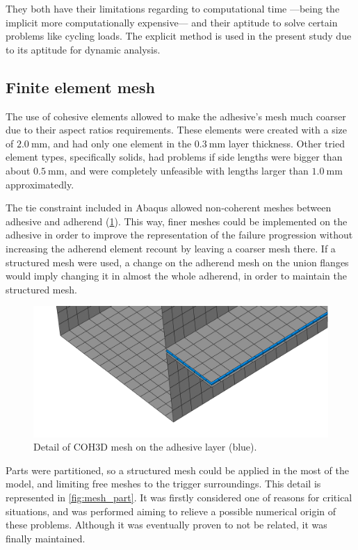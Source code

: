 \documentclass[
documentsize = a4, %
font = cmr, %
typesize = 11, %
printmode = true,
onehalfspacing = true,
language = en, %
titlepage = udciccp, %
degree = pt, %
dedication = true,
acknowledgements = true,
abstract-en = true,
abstract-es = false,
abstract-ga = false,
epigraphs = true,
toc = true,
lof = true,
lot = true,
frontmatterintoc = false,
notation = false,
minimal = false,
]{UDCthesis}
\begin{document}
They both have their limitations regarding to computational time ---being the implicit more computationally expensive--- and their aptitude to solve certain problems like cycling loads. The explicit method is used in the present study due to its aptitude for dynamic analysis.

\subsection{Finite element mesh}

The use of cohesive elements allowed to make the adhesive's mesh much coarser due to their aspect ratios requirements. These elements were created with a size of $\SI{2.0}{\mm}$, and had only one element in the $\SI{0.3}{\mm}$ layer thickness. Other tried element types, specifically solids, had problems if side lengths were bigger than about $\SI{0.5}{\mm}$, and were completely unfeasible with lengths larger than $\SI{1.0}{\mm}$ approximatedly.

The tie constraint included in Abaqus allowed non-coherent meshes between adhesive and adherend (\cref{fig:mesh_detail_coh3d_comparison}). This way, finer meshes could be implemented on the adhesive in order to improve the representation of the failure progression without increasing the adherend element recount by leaving a coarser mesh there. If a structured mesh were used, a change on the adherend mesh on the union flanges would imply changing it in almost the whole adherend, in order to maintain the structured mesh.

\begin{figure}
	\centering
	\includegraphics[width=0.7\linewidth]{IMG_CUTRES/mesh_detail_coh3d_comparison}
	\caption[Detail of \acrlong{COH3D} mesh on the adhesive layer.]{Detail of \acrlong{COH3D} mesh on the adhesive layer (blue).}
	\label{fig:mesh_detail_coh3d_comparison}
\end{figure}

Parts were partitioned, so a structured mesh could be applied in the most of the model, and limiting free meshes to the trigger surroundings. This detail is represented in \cref{fig:mesh_part}. It was firstly considered one of reasons for critical situations, and was performed aiming to relieve a possible numerical origin of these problems. Although it was eventually proven to not be related, it was finally maintained.
\end{document}
